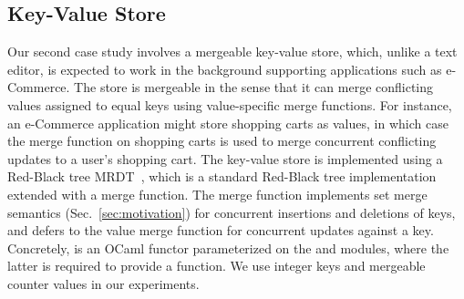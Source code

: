 
\subsection{Key-Value Store}

Our second case study involves a mergeable key-value store, which,
unlike a text editor, is expected to work in the background supporting
applications such as e-Commerce. The store is mergeable in the sense
that it can merge conflicting values assigned to equal keys using
value-specific merge functions. For instance, an e-Commerce
application might store shopping carts as values, in which case the
merge function on shopping carts is used to merge concurrent
conflicting updates to a user's shopping cart. The key-value store is
implemented using a Red-Black tree MRDT~\cite{mrdt}, which is a
standard Red-Black tree implementation extended with a merge function.
The merge function implements set merge semantics
(Sec.~\ref{sec:motivation}) for concurrent insertions and deletions of
keys, and defers to the value merge function for concurrent updates
against a key. Concretely,  is an OCaml functor
parameterized on the  and  modules, where the latter
is required to provide a  function. We use integer keys and
mergeable counter values in our experiments.


